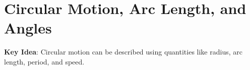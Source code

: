 \documentclass[main]{subfiles}
\begin{document}
\ifSubfilesClassLoaded{%
  \chaptermark{\chaptertwo}
}{}

\section{Circular Motion, Arc Length, and Angles} \label{ws2-1}










\textbf{Key Idea}: Circular motion can be described using quantities like radius, arc length, period, and speed.
\end{document}
